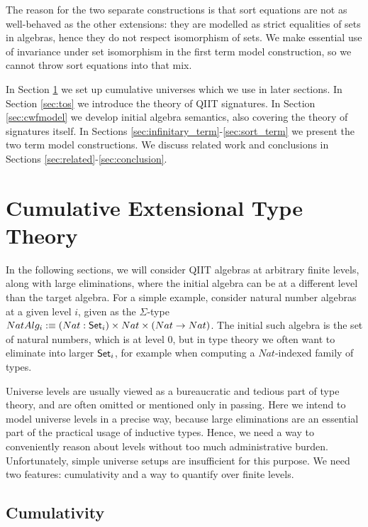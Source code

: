 \documentclass{llncs}
\begin{document}
The reason for the two separate constructions is that sort equations are not as
well-behaved as the other extensions: they are modelled as strict equalities of
sets in algebras, hence they do not respect isomorphism of sets. We make
essential use of invariance under set isomorphism in the first term model
construction, so we cannot throw sort equations into that mix.

In Section \ref{sec:levels} we set up cumulative universes which we use in later
sections. In Section \ref{sec:tos} we introduce the theory of QIIT
signatures. In Section \ref{sec:cwfmodel} we develop initial algebra semantics,
also covering the theory of signatures itself. In Sections
\ref{sec:infinitary_term}-\ref{sec:sort_term} we present the two term model
constructions. We discuss related work and conclusions in Sections
\ref{sec:related}-\ref{sec:conclusion}.


\section{Cumulative Extensional Type Theory}
\label{sec:levels}

In the following sections, we will consider QIIT algebras at arbitrary finite
levels, along with large eliminations, where the initial algebra can be at a
different level than the target algebra. For a simple example, consider natural
number algebras at a given level $i$, given as the $\Sigma$-type $NatAlg_i :\equiv(Nat :
\mathsf{Set}_i)\times Nat\times(Nat \rightarrow Nat)$. The initial such algebra is the set of
natural numbers, which is at level $0$, but in type theory we often want to
eliminate into larger $\mathsf{Set}_i$, for example when computing a $Nat$-indexed family
of types.

Universe levels are usually viewed as a bureaucratic and tedious part of type
theory, and are often omitted or mentioned only in passing. Here we intend to
model universe levels in a precise way, because large eliminations are an
essential part of the practical usage of inductive types. Hence, we need a way
to conveniently reason about levels without too much administrative
burden. Unfortunately, simple universe setups are insufficient for this
purpose. We need two features: cumulativity and a way to quantify over finite
levels.

\subsection{Cumulativity}
\end{document}
